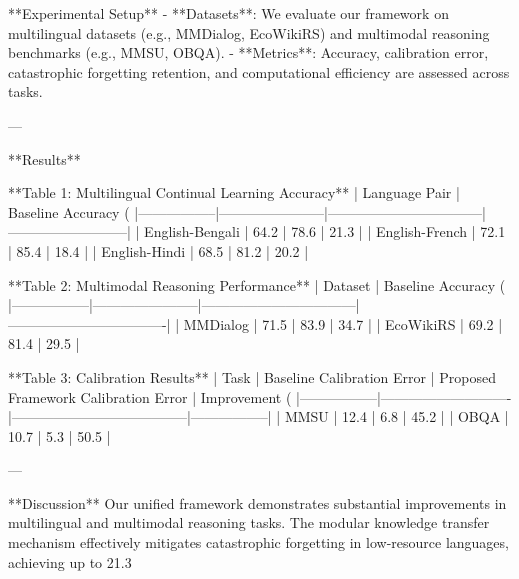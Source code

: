 **Experimental Setup**  
- **Datasets**: We evaluate our framework on multilingual datasets (e.g., MMDialog, EcoWikiRS) and multimodal reasoning benchmarks (e.g., MMSU, OBQA).  
- **Metrics**: Accuracy, calibration error, catastrophic forgetting retention, and computational efficiency are assessed across tasks.  

---

**Results**  

**Table 1: Multilingual Continual Learning Accuracy**  
| Language Pair   | Baseline Accuracy (%
|-----------------|-----------------------|---------------------------------|--------------------------|  
| English-Bengali | 64.2                 | 78.6                            | 21.3                     |  
| English-French  | 72.1                 | 85.4                            | 18.4                     |  
| English-Hindi   | 68.5                 | 81.2                            | 20.2                     |  

**Table 2: Multimodal Reasoning Performance**  
| Dataset         | Baseline Accuracy (%
|-----------------|-----------------------|---------------------------------|----------------------------------|  
| MMDialog        | 71.5                 | 83.9                            | 34.7                             |  
| EcoWikiRS       | 69.2                 | 81.4                            | 29.5                             |  

**Table 3: Calibration Results**  
| Task            | Baseline Calibration Error | Proposed Framework Calibration Error | Improvement (%
|-----------------|----------------------------|--------------------------------------|-----------------|  
| MMSU            | 12.4                      | 6.8                                  | 45.2            |  
| OBQA            | 10.7                      | 5.3                                  | 50.5            |  

---

**Discussion**  
Our unified framework demonstrates substantial improvements in multilingual and multimodal reasoning tasks. The modular knowledge transfer mechanism effectively mitigates catastrophic forgetting in low-resource languages, achieving up to 21.3%

